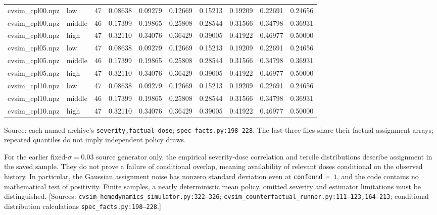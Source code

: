 \begin{center}
{\begin{tabular}{llllllllll}
cvsim\_cpl00.npz 
& low 
& 47 
& 0.08638 
& 0.09279 
& 0.12669 
& 0.15213 
& 0.19209 
& 0.22691 
& 0.24656 
\\

cvsim\_cpl00.npz 
& middle 
& 46 
& 0.17399 
& 0.19865 
& 0.25808 
& 0.28544 
& 0.31566 
& 0.34798 
& 0.36931 
\\

cvsim\_cpl00.npz 
& high 
& 47 
& 0.32110 
& 0.34076 
& 0.36429 
& 0.39005 
& 0.41922 
& 0.46977 
& 0.50000 
\\

cvsim\_cpl05.npz 
& low 
& 47 
& 0.08638 
& 0.09279 
& 0.12669 
& 0.15213 
& 0.19209 
& 0.22691 
& 0.24656 
\\

cvsim\_cpl05.npz 
& middle 
& 46 
& 0.17399 
& 0.19865 
& 0.25808 
& 0.28544 
& 0.31566 
& 0.34798 
& 0.36931 
\\

cvsim\_cpl05.npz 
& high 
& 47 
& 0.32110 
& 0.34076 
& 0.36429 
& 0.39005 
& 0.41922 
& 0.46977 
& 0.50000 
\\

cvsim\_cpl10.npz 
& low 
& 47 
& 0.08638 
& 0.09279 
& 0.12669 
& 0.15213 
& 0.19209 
& 0.22691 
& 0.24656 
\\

cvsim\_cpl10.npz 
& middle 
& 46 
& 0.17399 
& 0.19865 
& 0.25808 
& 0.28544 
& 0.31566 
& 0.34798 
& 0.36931 
\\

cvsim\_cpl10.npz 
& high 
& 47 
& 0.32110 
& 0.34076 
& 0.36429 
& 0.39005 
& 0.41922 
& 0.46977 
& 0.50000 
\\

\bottomrule
\end{tabular}}
\ifdim\wd0>\textwidth\resizebox{\textwidth}{!}{\usebox0}\else\usebox0\fi
\end{center}


Source: each named archive’s \texttt{severity,\allowbreak{}factual\_\allowbreak{}dose}; \texttt{spec\_\allowbreak{}facts.\allowbreak{}py:\allowbreak{}198–\allowbreak{}228}. The last three files share their factual assignment arrays; repeated quantiles do not imply independent policy draws.

For the earlier fixed-$\sigma=0.03$ source generator only, the empirical severity-dose correlation and tercile distributions describe assignment in the saved sample. They do not prove a failure of conditional overlap, meaning availability of relevant doses conditional on the observed history. In particular, the Gaussian assignment noise has nonzero standard deviation even at \texttt{confound =\allowbreak{} 1}, and the code contains no mathematical test of positivity. Finite samples, a nearly deterministic mean policy, omitted severity and estimator limitations must be distinguished. [Sources: \texttt{cvsim\_\allowbreak{}hemodynamics\_\allowbreak{}simulator.\allowbreak{}py:\allowbreak{}322–\allowbreak{}326}; \texttt{cvsim\_\allowbreak{}counterfactual\_\allowbreak{}runner.\allowbreak{}py:\allowbreak{}111–\allowbreak{}123,\allowbreak{}164–\allowbreak{}213}; conditional distribution calculations \texttt{spec\_\allowbreak{}facts.\allowbreak{}py:\allowbreak{}198–\allowbreak{}228}.]


